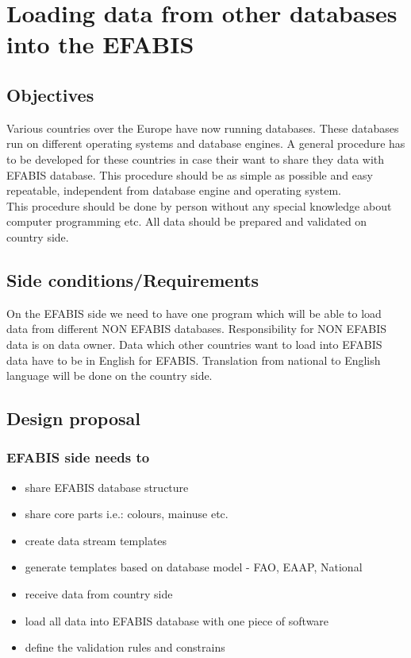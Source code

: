 \chapter{Loading data from other databases into the EFABIS }

\newpage 
\section{Objectives}
Various countries over the Europe have now running databases. These 
databases run on different operating systems and database engines. 
A general procedure has to be developed for these countries in case their want to share they data with EFABIS database.
This procedure should be as simple as possible and 
easy repeatable, independent from database engine and 
operating system. \\
This procedure should be done by person without any special knowledge about 
computer programming etc. All data should be prepared and validated on country 
side.\section{Side conditions/Requirements}
On the EFABIS side we need to have one program which will be able to load data 
from different NON EFABIS databases. Responsibility for NON EFABIS data is on 
data owner. Data which other countries want to load into EFABIS 
data have to be in English for EFABIS. 
Translation from national to English language will be done on the country 
side.\section{Design proposal}
\subsection{EFABIS side needs to}
\begin{itemize}
\item share EFABIS database structure 
\item share core parts i.e.: colours, mainuse etc.
\item create data stream templates
\item generate templates based on database model - FAO, EAAP, National
\item receive data from country side
\item load all data into EFABIS database with one piece of software
\item define the validation rules and constrains
\end{itemize}


